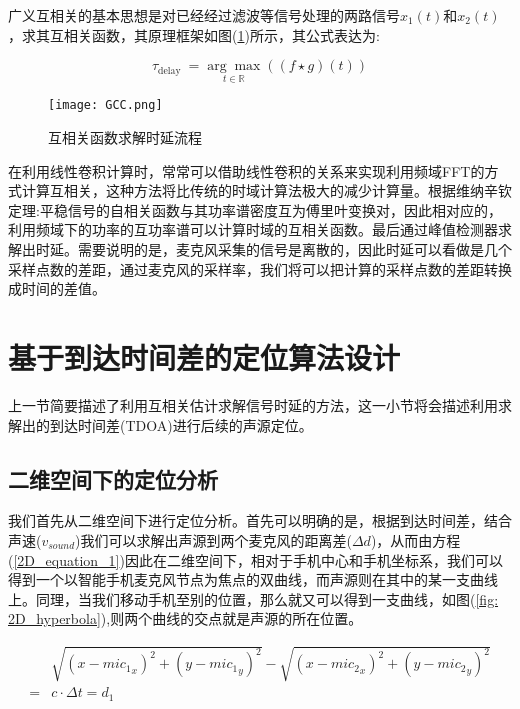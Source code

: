 \documentclass[winfonts,oneside]{njuthesis}
\begin{document}
		广义互相关的基本思想是对已经经过滤波等信号处理的两路信号$x_1(t)$和$x_2(t)$，求其互相关函数，其原理框架如图(\ref{fig: GCC})所示，其公式表达为:
		
		\begin{equation}
		\tau_{\text {delay }}=\underset{t \in \mathbb{R}}{\arg \max }((f \star g)(t))
		\end{equation}
		
		\begin{figure}[H]
			\centering
			\texttt{[image: GCC.png]} 
			\caption{互相关函数求解时延流程}
			\label{fig: GCC}
		\end{figure}	
		
		在利用线性卷积计算时，常常可以借助线性卷积的关系来实现利用频域FFT的方式计算互相关，这种方法将比传统的时域计算法极大的减少计算量。根据维纳辛钦定理:平稳信号的自相关函数与其功率谱密度互为傅里叶变换对，因此相对应的，利用频域下的功率的互功率谱可以计算时域的互相关函数。最后通过峰值检测器求解出时延。需要说明的是，麦克风采集的信号是离散的，因此时延可以看做是几个采样点数的差距，通过麦克风的采样率，我们将可以把计算的采样点数的差距转换成时间的差值。
	
	\section{基于到达时间差的定位算法设计}
	
		上一节简要描述了利用互相关估计求解信号时延的方法，这一小节将会描述利用求解出的到达时间差(TDOA)进行后续的声源定位。
		
		\subsection{二维空间下的定位分析}
		
		我们首先从二维空间下进行定位分析。首先可以明确的是，根据到达时间差，结合声速($v_{sound}$)我们可以求解出声源到两个麦克风的距离差($\Delta d$)，从而由方程(\ref{2D_equation_1})因此在二维空间下，相对于手机中心和手机坐标系，我们可以得到一个以智能手机麦克风节点为焦点的双曲线，而声源则在其中的某一支曲线上。同理，当我们移动手机至别的位置，那么就又可以得到一支曲线，如图(\ref{fig: 2D_hyperbola}),则两个曲线的交点就是声源的所在位置。
		
		\begin{equation}
		\begin{aligned}
			&\sqrt{(x-{mic_1}_x)^2+(y-{mic_1}_y)^2} - \sqrt{(x-{mic_2}_x)^2+(y-{mic_2}_y)^2}\\
		  = & c \cdot \Delta t= d_1 \label{2D_equation_1}
		\end{aligned}
		\end{equation}
		
\end{document}
